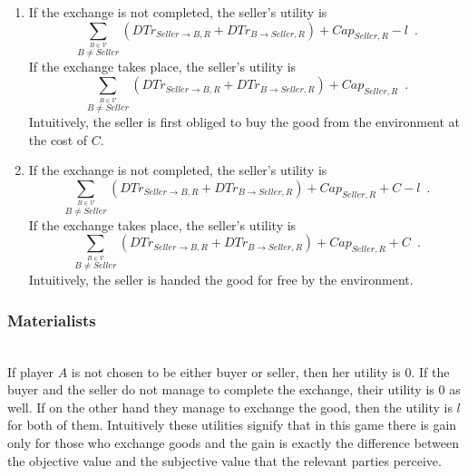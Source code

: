    \begin{enumerate}
      \item If the exchange is not completed, the seller's utility is 
      \begin{equation*}
        \sum\limits_{\overset{B \in \mathcal{V}}{B \neq Seller}}\left(DTr_{Seller \rightarrow B, R} + DTr_{B \rightarrow
	Seller, R}\right) + Cap_{Seller, R} - l \enspace.
      \end{equation*}
      If the exchange takes place, the seller's utility is
      \begin{equation*}
        \sum\limits_{\overset{B \in \mathcal{V}}{B \neq Seller}}\left(DTr_{Seller \rightarrow B, R} + DTr_{B \rightarrow
	Seller, R}\right) + Cap_{Seller, R} \enspace.
      \end{equation*}
      Intuitively, the seller is first obliged to buy the good from the environment at the cost of $C$.

      \item If the exchange is not completed, the seller's utility is
      \begin{equation*}
        \sum\limits_{\overset{B \in \mathcal{V}}{B \neq Seller}}\left(DTr_{Seller \rightarrow B, R} + DTr_{B \rightarrow
	Seller, R}\right) + Cap_{Seller, R} + C - l \enspace.
      \end{equation*}
      If the exchange takes place, the seller's utility is
      \begin{equation*}
        \sum\limits_{\overset{B \in \mathcal{V}}{B \neq Seller}}\left(DTr_{Seller \rightarrow B, R} + DTr_{B \rightarrow
	Seller, R}\right) + Cap_{Seller, R} + C \enspace.
      \end{equation*}
      Intuitively, the seller is handed the good for free by the environment.
    \end{enumerate}

  \subsubsection{Materialists} \ \\

    If player $A$ is not chosen to be either buyer or seller, then her utility is 0. If the buyer and the seller do not
    manage to complete the exchange, their utility is 0 as well. If on the other hand they manage to exchange the good, then
    the utility is $l$ for both of them. Intuitively these utilities signify that in this game there is gain only for those
    who exchange goods and the gain is exactly the difference between the objective value and the subjective value that the
    relevant parties perceive.
